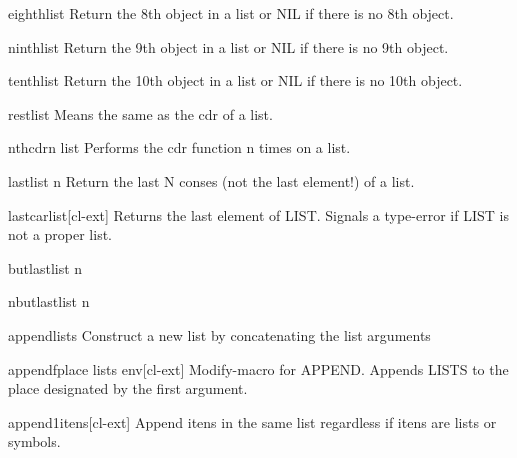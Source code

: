 \documentclass[10pt,english]{book}
\begin{document}
\begin{accessor}{eighth}{list}
  Return the 8th object in a list or NIL if there is no 8th object.
\end{accessor}

\begin{accessor}{ninth}{list}
  Return the 9th object in a list or NIL if there is no 9th object.
\end{accessor}

\begin{accessor}{tenth}{list}
  Return the 10th object in a list or NIL if there is no 10th object.
\end{accessor}

\begin{accessor}{rest}{list}
  Means the same as the cdr of a list.
\end{accessor}

\begin{function}{nthcdr}{n list}
  Performs the cdr function n times on a list.
\end{function}

\begin{function}{last}{list \op n}
  Return the last N conses (not the last element!) of a list.
\end{function}

\begin{function}{lastcar}{list}[cl-ext]
  Returns the last element of LIST. Signals a type-error if LIST is not a
proper list.
\end{function}

\begin{function}{butlast}{list \op n}
  
\end{function}

\begin{function}{nbutlast}{list \op n}
  
\end{function}

\begin{function}{append}{\rest lists}
  Construct a new list by concatenating the list arguments
\end{function}

\begin{macro}{appendf}{place \rest lists \env env}[cl-ext]
  Modify-macro for APPEND. Appends LISTS to the place designated by the first
argument.
\end{macro}

\begin{function}{append1}{\rest itens}[cl-ext]
  Append itens in the same list regardless if itens are lists or
  symbols.
\end{function}
\end{document}
